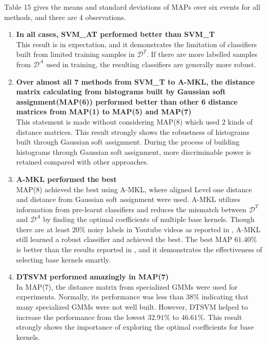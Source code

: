 \noindent Table 15 gives the means and standard deviations of MAPs over six events for all methods, and there are 4 observations.
\begin{enumerate}
  \item{\bf In all cases, SVM\_AT performed better than SVM\_T}\\
  This result is in expectation, and it demonstrates the limitation of classifiers built from limited training samples in $\mathcal{D}^T$. If there are more labelled samples from $\mathcal{D}^A$ used in training, the resulting classifiers are generally more robust. 

  \item{\bf Over almost all 7 methods from SVM\_T to A-MKL, the distance matrix calculating from histograms built by Gaussian soft assignment(MAP(6)) performed better than other 6 distance matrices from MAP(1) to MAP(5) and MAP(7)}\\
  This statement is made without considering MAP(8) which used 2 kinds of distance matrices. This result strongly shows the robustness of histograms built through Gaussian soft assignment. During the process of building histograms through Gaussian soft assignment, more discriminable power is retained compared with other approaches. 

  \item{\bf A-MKL performed the best}\\
  MAP(8) achieved the best using A-MKL, where aligned Level one distance and distance from Gaussian soft assignment were used. A-MKL utilizes information from pre-learnt classifiers and reduces the mismatch between $\mathcal{D}^T$ and $\mathcal{D}^A$ by finding the optimal coefficients of multiple base kernels. Though there are at least $20\%$ noisy labels in Youtube videos as reported in \cite{duan2012visual}, A-MKL still learned a robust classifier and achieved the best. The best MAP $61.40\%$ is better than the results reported in \cite{duan2012visual}, and it demonstrates the effectiveness of selecting base kernels smartly. 

  \item{\bf DTSVM performed amazingly in MAP(7)}\\
  In MAP(7), the distance matrix from specialized GMMs were used for experiments. Normally, its performance was less than $38\%$ indicating that many specialized GMMs were not well built. However, DTSVM helped to increase the performance from the lowest $32.91\%$ to $46.61\%$. This result strongly shows the importance of exploring the optimal coefficients for base kernels.

\end{enumerate}
